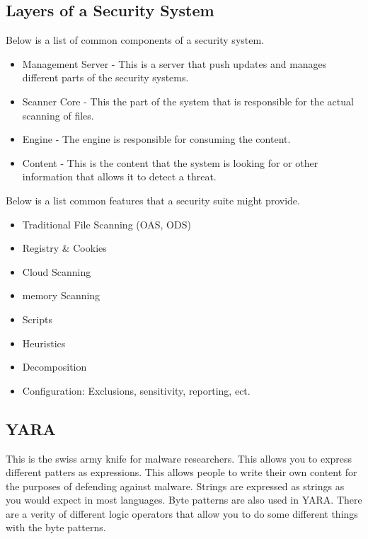 \documentclass[letterpaper, onecolumn,10pt]{IEEEtran}
\begin{document}
            \subsection{Layers of a Security System}
            Below is a list of common components of a security system.
            \begin{itemize}
                \item Management Server - This is a server that push updates and manages different parts of the security systems.\\
                \item Scanner Core - This the part of the system that is responsible for the actual scanning of files.\\
                \item Engine - The engine is responsible for consuming the content.\\
                \item Content - This is the content that the system is looking for or other information that allows it to detect a threat.\\
            \end{itemize}
            
            Below is a list common features that a security suite might provide.
            \begin{itemize}
                \item Traditional File Scanning (OAS, ODS)\\
                \item Registry & Cookies\\
                \item Cloud Scanning\\
                \item memory Scanning\\
                \item Scripts\\
                \item Heuristics\\
                \item Decomposition\\
                \item Configuration: Exclusions, sensitivity, reporting, ect.\\
            \end{itemize}
            
            \subsection{YARA}
            This is the swiss army knife for malware researchers. This allows you to express different patters as expressions. This allows people to write their own content for the purposes of defending against malware. Strings are expressed as strings as you would expect in most languages. Byte patterns are also used in YARA. There are a verity of different logic operators that allow you to do some different things with the byte patterns.\\
            
\end{document}
